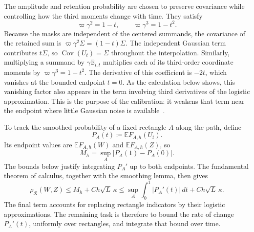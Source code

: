 \documentclass[11pt,letterpaper]{article}
\theoremstyle{remark}
\newcommand{\E}{\mathbb E}
\newcommand{\Cov}{\operatorname{Cov}}
\newcommand{\rh}{\rho_{\mathcal R}}
\newcommand{\dd}{\,d}
\begin{document}
The amplitude and retention probability are chosen to preserve covariance
while controlling how the third moments change with time. They satisfy
\[
 \varpi\gamma^2=1-t,\qquad
 \varpi\gamma^3=1-t^2.
\]
Because the masks are independent of the centered summands, the covariance
of the retained sum is \(\varpi\gamma^2\Sigma=(1-t)\Sigma\). The independent
Gaussian term contributes \(t\Sigma\), so \(\Cov(U_t)=\Sigma\) throughout
the interpolation. Similarly, multiplying a summand by
\(\gamma\mathbb B_{i,t}\) multiplies each of its third-order coordinate
moments by \(\varpi\gamma^3=1-t^2\). The derivative of this coefficient
is \(-2t\), which vanishes at the bounded endpoint \(t=0\). As the
calculation below shows, this vanishing factor also appears in the term
involving third derivatives of the logistic approximation. This is the
purpose of the calibration: it weakens that term near the endpoint where
little Gaussian noise is available~\cite[eq.~(17)]{AL}.

To track the smoothed probability of a fixed rectangle \(A\) along the
path, define
\[
 P_A(t)\coloneqq \E F_{A,h}(U_t).
\]
Its endpoint values are \(\E F_{A,h}(W)\) and \(\E F_{A,h}(Z)\), so
\[
 M_h=\sup_A|P_A(1)-P_A(0)|.
\]
The bounds below justify integrating \(P_A'\) up to both endpoints.
The fundamental theorem of calculus, together with the smoothing lemma,
then gives
\begin{equation}
 \rh(W,Z)\le M_h+Ch\sqrt L\,\kappa
 \le\sup_A\int_0^1|P_A'(t)|\dd t+Ch\sqrt L\,\kappa.
 \label{eq:roadmap}
\end{equation}
The final term accounts for replacing rectangle indicators by their
logistic approximations. The remaining task is therefore to bound the
rate of change \(P_A'(t)\), uniformly over rectangles, and integrate
that bound over time.
\end{document}
